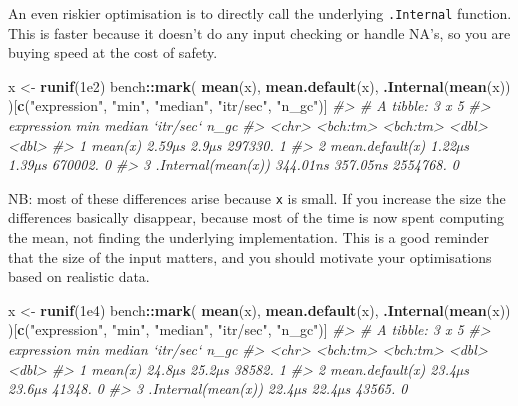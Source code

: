 \documentclass[]{book}
\newenvironment{Shaded}{\begin{snugshade}}{\end{snugshade}}
\newcommand{\CommentTok}[1]{\textcolor[rgb]{0.37,0.37,0.37}{\textit{#1}}}
\newcommand{\FloatTok}[1]{\textcolor[rgb]{0.06,0.06,0.06}{#1}}
\newcommand{\KeywordTok}[1]{\textcolor[rgb]{0.27,0.27,0.27}{\textbf{#1}}}
\newcommand{\NormalTok}[1]{#1}
\newcommand{\OperatorTok}[1]{\textcolor[rgb]{0.43,0.43,0.43}{\textbf{#1}}}
\newcommand{\StringTok}[1]{\textcolor[rgb]{0.5,0.5,0.5}{#1}}
\begin{document}
An even riskier optimisation is to directly call the underlying \texttt{.Internal} function. This is faster because it doesn't do any input checking or handle NA's, so you are buying speed at the cost of safety.

\begin{Shaded}
\begin{Highlighting}[]
\NormalTok{x <-}\StringTok{ }\KeywordTok{runif}\NormalTok{(}\FloatTok{1e2}\NormalTok{)}
\NormalTok{bench}\OperatorTok{::}\KeywordTok{mark}\NormalTok{(}
  \KeywordTok{mean}\NormalTok{(x),}
  \KeywordTok{mean.default}\NormalTok{(x),}
  \KeywordTok{.Internal}\NormalTok{(}\KeywordTok{mean}\NormalTok{(x))}
\NormalTok{)[}\KeywordTok{c}\NormalTok{(}\StringTok{"expression"}\NormalTok{, }\StringTok{"min"}\NormalTok{, }\StringTok{"median"}\NormalTok{, }\StringTok{"itr/sec"}\NormalTok{, }\StringTok{"n_gc"}\NormalTok{)]}
\CommentTok{#> # A tibble: 3 x 5}
\CommentTok{#>   expression              min   median `itr/sec`  n_gc}
\CommentTok{#>   <chr>              <bch:tm> <bch:tm>     <dbl> <dbl>}
\CommentTok{#> 1 mean(x)              2.59µs    2.9µs   297330.     1}
\CommentTok{#> 2 mean.default(x)      1.22µs   1.39µs   670002.     0}
\CommentTok{#> 3 .Internal(mean(x)) 344.01ns 357.05ns  2554768.     0}
\end{Highlighting}
\end{Shaded}

NB: most of these differences arise because \texttt{x} is small. If you increase the size the differences basically disappear, because most of the time is now spent computing the mean, not finding the underlying implementation. This is a good reminder that the size of the input matters, and you should motivate your optimisations based on realistic data.

\begin{Shaded}
\begin{Highlighting}[]
\NormalTok{x <-}\StringTok{ }\KeywordTok{runif}\NormalTok{(}\FloatTok{1e4}\NormalTok{)}
\NormalTok{bench}\OperatorTok{::}\KeywordTok{mark}\NormalTok{(}
  \KeywordTok{mean}\NormalTok{(x),}
  \KeywordTok{mean.default}\NormalTok{(x),}
  \KeywordTok{.Internal}\NormalTok{(}\KeywordTok{mean}\NormalTok{(x))}
\NormalTok{)[}\KeywordTok{c}\NormalTok{(}\StringTok{"expression"}\NormalTok{, }\StringTok{"min"}\NormalTok{, }\StringTok{"median"}\NormalTok{, }\StringTok{"itr/sec"}\NormalTok{, }\StringTok{"n_gc"}\NormalTok{)]}
\CommentTok{#> # A tibble: 3 x 5}
\CommentTok{#>   expression              min   median `itr/sec`  n_gc}
\CommentTok{#>   <chr>              <bch:tm> <bch:tm>     <dbl> <dbl>}
\CommentTok{#> 1 mean(x)              24.8µs   25.2µs    38582.     1}
\CommentTok{#> 2 mean.default(x)      23.4µs   23.6µs    41348.     0}
\CommentTok{#> 3 .Internal(mean(x))   22.4µs   22.4µs    43565.     0}
\end{Highlighting}
\end{Shaded}
\end{document}
